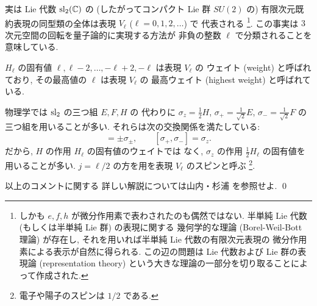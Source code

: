\documentclass[12pt,twoside]{jarticle}
\begin{document}
\begin{guide}
  実は Lie 代数 $\mathrm{sl}_2({\mathbb C})$ の (したがってコンパクト Lie 群 $SU(2)$ の)
  有限次元既約表現の同型類の全体は表現 $V_\ell$ ($\ell=0,1,2,\ldots$) で
  代表される%
  \footnote{しかも $e,f,h$ が微分作用素で表わされたのも偶然ではない.
    半単純 Lie 代数 (もしくは半単純 Lie 群) の表現に関する
    幾何学的な理論 (Borel-Weil-Bott 理論) が存在し, 
    それを用いれば半単純 Lie 代数の有限次元表現の
    微分作用素による表示が自然に得られる.
    この辺の問題は Lie 代数および Lie 群の表現論 (representation theory) 
    という大きな理論の一部分を切り取ることによって作成された.}.
  この事実は $3$ 次元空間の回転を量子論的に実現する方法が
  非負の整数 $\ell$ で分類されることを意味している.

  $H_\ell$ の固有値 $\ell,\ell-2,\ldots,-\ell+2,-\ell$ は表現 $V_\ell$ の
  ウェイト (weight) と呼ばれており, その最高値の $\ell$ は表現 $V_\ell$ の
  最高ウェイト (highest weight) と呼ばれている.

  物理学では $\mathrm{sl}_2$ の三つ組 $E,F,H$ の
  代わりに $\sigma_z=\frac{1}{2}H$, $\sigma_+=\frac{1}{\sqrt{2}}E$, %
  $\sigma_-=\frac{1}{\sqrt{2}}F$ の三つ組を用いることが多い.
  それらは次の交換関係を満たしている:
  \begin{equation*}
    [\sigma_z, \sigma_\pm] = \pm\sigma_\pm, \qquad
    [\sigma_+, \sigma_-] = \sigma_z.
  \end{equation*}
  だから, $H$ の作用 $H_\ell$ の固有値のウェイトでは
  なく, $\sigma_z$ の作用 $\frac{1}{2}H_\ell$ の固有値を用いることが多い.
  $j=\ell/2$ の方を用を表現 $V_\ell$ のスピンと呼ぶ%
  \footnote{電子や陽子のスピンは $1/2$ である.}.

  以上のコメントに関する
  詳しい解説については山内・杉浦 \cite{renzokugunron} を参照せよ.
  \qed
\end{guide}

\end{document}
